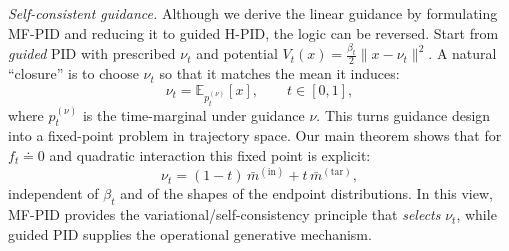 \documentclass[11pt,onecolumn]{article}
\begin{document}

\begin{tcolorbox}[colback=blue!4,colframe=blue!45,
  title={\small\bfseries  Perspective (alternative viewpoint)}]
\emph{Self-consistent guidance.}
Although we derive the linear guidance by formulating MF-PID and reducing it to guided H-PID, the logic can be reversed.
Start from \emph{guided} PID with prescribed $\nu_t$ and potential
$V_t(x)=\frac{\beta_t}{2}\|x-\nu_t\|^2$.
A natural ``closure'' is to choose $\nu_t$ so that it matches the mean it induces:
\[
\nu_t=\mathbb{E}_{p_t^{(\nu)}}[x],\qquad t\in[0,1],
\]
where $p_t^{(\nu)}$ is the time-marginal under guidance $\nu$.
This turns guidance design into a fixed-point problem in trajectory space.
Our main theorem shows that for $f_t\doteq 0$ and quadratic interaction this fixed point is explicit:
\[
\nu_t=(1-t)\,\bar m^{(\mathrm{in})}+t\,\bar m^{(\mathrm{tar})},
\]
independent of $\beta_t$ and of the shapes of the endpoint distributions.
In this view, MF-PID provides the variational/self-consistency principle that \emph{selects} $\nu_t$,
while guided PID supplies the operational generative mechanism.
\end{tcolorbox}
\end{document}
